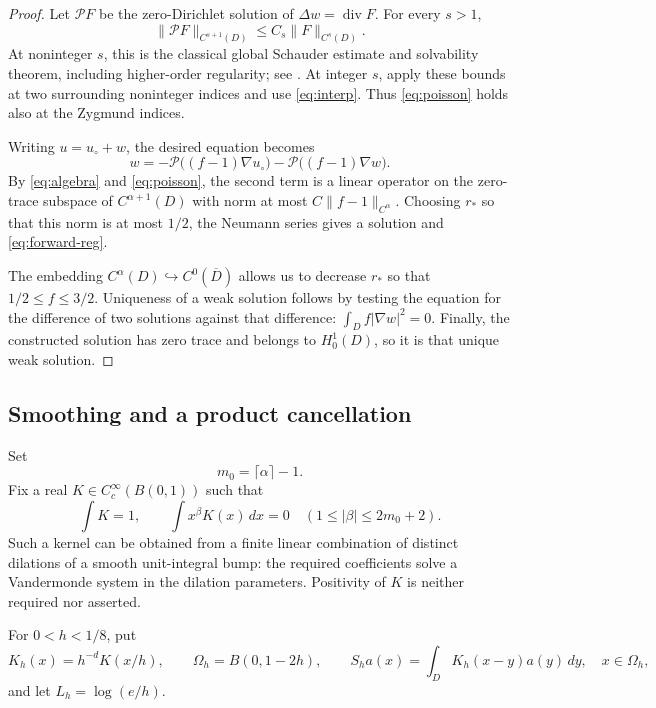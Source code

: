 \documentclass[11pt]{article}
\theoremstyle{remark}
\DeclareMathOperator{\divergence}{div}
\begin{document}
\begin{proof}
Let \(\mathcal P F\) be the zero-Dirichlet solution of
\(\Delta w=\divergence F\). For every \(s>1\),
\begin{equation}\label{eq:poisson}
\|\mathcal P F\|_{C^{s+1}(D)}
\leq C_s\|F\|_{C^s(D)}.
\end{equation}
At noninteger \(s\), this is the classical global Schauder estimate
and solvability theorem, including higher-order regularity; see
\cite[Theorems~6.6, 6.14 and 6.19]{GT}.
At integer \(s\), apply these bounds at two surrounding noninteger
indices and use \eqref{eq:interp}. Thus \eqref{eq:poisson} holds
also at the Zygmund indices.

Writing \(u=u_\circ+w\), the desired equation becomes
\[
w=-\mathcal P\big((f-1)\nabla u_\circ\big)
  -\mathcal P\big((f-1)\nabla w\big).
\]
By \eqref{eq:algebra} and \eqref{eq:poisson}, the second term is a
linear operator on the zero-trace subspace of \(C^{\alpha+1}(D)\)
with norm at most \(C\|f-1\|_{C^\alpha}\). Choosing \(r_*\) so that
this norm is at most \(1/2\), the Neumann series gives a solution
and \eqref{eq:forward-reg}.

The embedding \(C^\alpha(D)\hookrightarrow C^0(\overline D)\)
allows us to decrease \(r_*\) so that \(1/2\leq f\leq3/2\).
Uniqueness of a weak solution follows by testing the equation for
the difference of two solutions against that difference:
\(\int_D f|\nabla w|^2=0\). Finally, the constructed solution has
zero trace and belongs to \(H^1_0(D)\), so it is that unique weak
solution.
\end{proof}

\subsection{Smoothing and a product cancellation}

Set
\[
m_0=\lceil\alpha\rceil-1.
\]
Fix a real \(K\in C^\infty_c(B(0,1))\) such that
\begin{equation}\label{eq:kernel}
\int K=1,\qquad
\int x^\beta K(x)\,dx=0
\quad(1\leq|\beta|\leq2m_0+2).
\end{equation}
Such a kernel can be obtained from a finite linear combination of
distinct dilations of a smooth unit-integral bump: the required
coefficients solve a Vandermonde system in the dilation parameters.
Positivity of \(K\) is neither required nor asserted.

For \(0<h<1/8\), put
\[
K_h(x)=h^{-d}K(x/h),\qquad
\Omega_h=B(0,1-2h),\qquad
S_h a(x)=\int_D K_h(x-y)a(y)\,dy,\quad x\in\Omega_h,
\]
and let \(L_h=\log(e/h)\).
\end{document}
